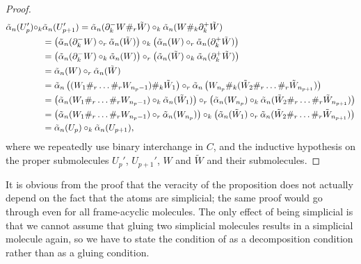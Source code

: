 \documentclass[12pt,a4paper]{article}
\numberwithin{equation}{section}
\begin{document}
\begin{proof}
    \begin{align}
        \tilde{\alpha}_n (U'_p) \circ_k& \tilde{\alpha}_n (U'_{p+1}) = \tilde{\alpha}_n (\partial_k^- W \#_r \tilde{W}) \circ_k \tilde{\alpha}_n (W \#_k \partial_k^+ \tilde{W}) \\
        &= \left( \tilde{\alpha}_n (\partial_k^- W) \circ_r \tilde{\alpha}_n (\tilde{W}) \right) \circ_k \left( \tilde{\alpha}_n (W) \circ_r \tilde{\alpha}_n (\partial_k^+ \tilde{W}) \right) \notag\\
        &= \left(\vphantom{\tilde{W}} \tilde{\alpha}_n (\partial_k^- W) \circ_k \tilde{\alpha}_n (W) \right) \circ_r \left( \tilde{\alpha}_n (\tilde{W}) \circ_k \tilde{\alpha}_n (\partial_k^+ \tilde{W}) \right) \notag\\
        &= \tilde{\alpha}_n (W) \circ_r \tilde{\alpha}_n (\tilde{W}) \notag\\
        &= \tilde{\alpha}_n \left( (W_1 \#_r \dots \#_r W_{n_p - 1}) \#_k \tilde{W}_1 \right) \circ_r \tilde{\alpha}_n \left( W_{n_p} \#_k (\tilde{W}_2 \#_r \dots \#_r \tilde{W}_{n_{p+1}}) \right) \notag\\
        &= \left( \tilde{\alpha}_n (W_1 \#_r \dots \#_r W_{n_p - 1}) \circ_k \tilde{\alpha}_n (\tilde{W}_1) \right) \circ_r \left( \tilde{\alpha}_n (W_{n_p}) \circ_k \tilde{\alpha}_n (\tilde{W}_2 \#_r \dots \#_r \tilde{W}_{n_{p+1}}) \right) \notag\\
        &= \left(\vphantom{\tilde{W}} \tilde{\alpha}_n (W_1 \#_r \dots \#_r W_{n_p - 1}) \circ_r \tilde{\alpha}_n (W_{n_p}) \right) \circ_k \left( \tilde{\alpha}_n (\tilde{W}_1) \circ_r \tilde{\alpha}_n (\tilde{W}_2 \#_r \dots \#_r \tilde{W}_{n_{p+1}}) \right) \notag\\
        &= \tilde{\alpha}_n (U_p) \circ_k \tilde{\alpha}_n (U_{p+1}), \notag
    \end{align}
    where we repeatedly use binary interchange in $C$, and the inductive hypothesis on the proper submolecules $U_p'$, $U_{p+1}'$, $W$ and $\tilde{W}$ and their submolecules.
\end{proof}

\begin{remark}
    It is obvious from the proof that the veracity of the proposition does not actually depend on the fact that the atoms are simplicial; the same proof would go through even for all frame-acyclic molecules. The only effect of being simplicial is that we cannot assume that gluing two simplicial molecules results in a simplicial molecule again, so we have to state the condition of  as a decomposition condition rather than as a gluing condition.
\end{remark}
\end{document}
